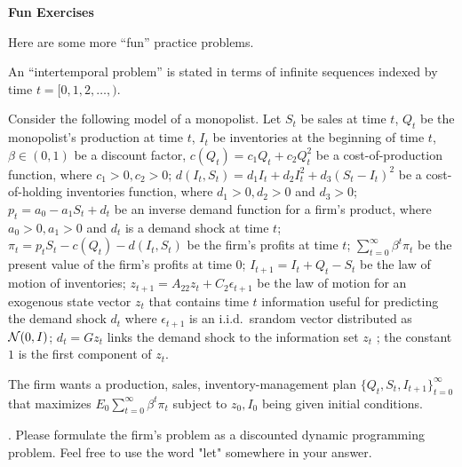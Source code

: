 

\paper

\overfullrule=0pt
\def\frac#1#2{#1\over #2}
%
\def\bmatrix#1{\left[ \matrix{#1} \right]}
\def\be{{\beta}}
\def\toone{{t+1}}

\overfullrule=0pt


\centerline{\bf  Fun Exercises}

\medskip
{} Here are some more ``fun'' practice problems.

\medskip
{} An ``intertemporal problem'' is stated in terms of  infinite sequences indexed by time $t = [0, 1, 2, \ldots, )$.



\medskip
{} Consider the following model of a monopolist.  Let  $S_t$ be sales at time $t$, $Q_t$ be the monopolist's production  at time $t$,
 $I_t$ be inventories at the beginning of time $t$,  $\beta \in (0,1)$ be a discount factor,  $c(Q_t) = c_1 Q_t + c_2 Q_t^2$ be a cost-of-production function, where $c_1>0, c_2>0$; 
  $d(I_t, S_t) = d_1 I_t + d_2 I_t^2  + d_3 (S_t - I_t)^2$ be a cost-of-holding inventories function, where $d_1 >0, d_2 >0 $ and $d_3 >0$;
$p_t = a_0 - a_1 S_t + d_t $ be an inverse demand function for a firm's product, where $a_0>0, a_1 >0$ and $d_t$ is a demand shock at time  $t$;
   $\pi_t = p_t S_t - c(Q_t) - d(I_t, S_t) $ be the firm's profits at time $t$;
   $\sum_{t=0}^\infty \beta^t \pi_t $ be the present value of the firm's profits at time $0$;  $I_{t+1} = I_t + Q_t - S_t$ be the law of motion of inventories;
 $z_{t+1} = A_{22} z_t + C_2 \epsilon_{t+1} $ be the law of motion for an exogenous state vector $z_t$ that contains time $t$ information useful for predicting the demand shock $d_t$ where
 $\epsilon_{t+1}$ is an i.i.d.~srandom vector distributed as ${\cal N}(0,I)$; 
   $d_t = G z_t $ links the demand shock to the information set $z_t$ ;
   the constant $1$ is the first component of $z_t$.
   
   The firm wants  a production, sales, inventory-management plan $\{Q_t, S_t, I_{t+1}\}_{t=0}^\infty$ that maximizes $E_0 \sum_{t=0}^\infty \beta^t \pi_t $
   subject to $z_0,  I_0 $ being given initial conditions.
   
   
 . Please formulate the firm's  problem as a discounted dynamic programming problem.  Feel free to use  the word "let" somewhere in your answer.
 
